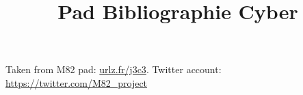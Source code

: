 \documentclass[12pt,a4paper]{article}
\author{}
\title{Pad Bibliographie Cyber}
\date{}
\begin{document}
\maketitle
\thispagestyle{empty}
Taken from M82 pad: \url{urlz.fr/j3c3}. Twitter account: \url{https://twitter.com/M82_project}
\nocite{*}
\renewcommand{\thepage}{}


\end{document}
